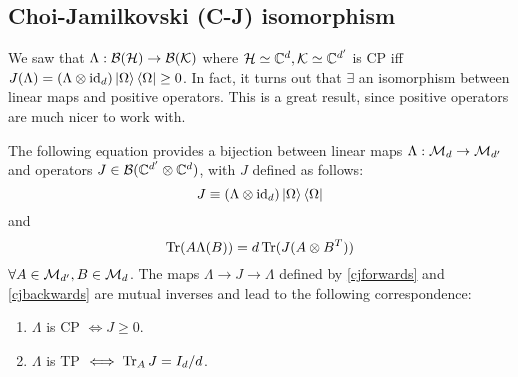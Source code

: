 \subsection*{Choi-Jamilkovski (C-J) isomorphism} We saw that $\Lambda:\mathcal{B}(\mathcal H)\to \mathcal{B}(\mathcal{K})$ where $\mathcal H\simeq \mathbb{C}^d, \mathcal{K}\simeq \mathbb{C}^{d'}$ is CP iff $J(\Lambda)=(\Lambda \otimes \operatorname{id}_d)\left| \Omega \right>\left< \Omega \right| \geq 0$. In fact, it turns out that $\exists$ an isomorphism between linear maps and positive operators. This is a great result, since positive operators are much nicer to work with.
\begin{thm}
    The following equation provides a bijection between linear maps $\Lambda:\mathcal{M}_d \to \mathcal{M}_{d'}$ and operators $J \in \mathcal{B}(\mathbb{C}^{d'}\otimes \mathbb{C}^d)$, with $J$ defined as follows:
    \begin{equation}\label{cjforwards}
        J\equiv (\Lambda \otimes \operatorname{id}_d)\left| \Omega \right>\left< \Omega \right|
    \end{equation}
    and
    \begin{equation}\label{cjbackwards}
        \operatorname{Tr}(A\Lambda(B))=d \operatorname{Tr} (J(A\otimes B^T))
    \end{equation}
    $\forall A \in \mathcal{M}_{d'},B\in \mathcal{M}_d$.
    The maps $\Lambda \to J \to \Lambda$ defined by \ref{cjforwards} and \ref{cjbackwards} are mutual inverses and lead to the following correspondence:
    \begin{enumerate}
        \item $\Lambda$ is CP $\iff J \geq 0$.
        \item $\Lambda$ is TP $\iff \operatorname{Tr}_A J = I_d/d$.
    \end{enumerate}
\end{thm}
